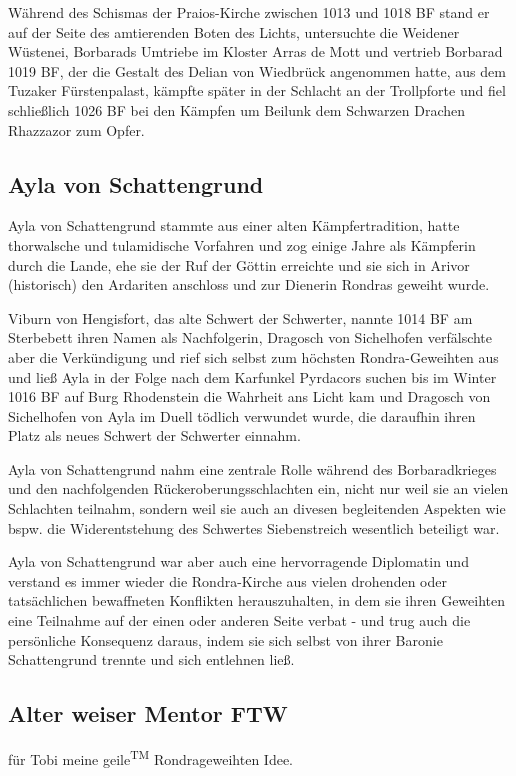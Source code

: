 Während des Schismas der Praios-Kirche zwischen 1013 und 1018 BF stand er auf der Seite des amtierenden Boten des Lichts, untersuchte die Weidener Wüstenei, Borbarads Umtriebe im Kloster Arras de Mott und vertrieb Borbarad 1019 BF, der die Gestalt des Delian von Wiedbrück angenommen hatte, aus dem Tuzaker Fürstenpalast, kämpfte später in der Schlacht an der Trollpforte und fiel schließlich 1026 BF bei den Kämpfen um Beilunk dem Schwarzen Drachen Rhazzazor zum Opfer. 

\subsection{Ayla von Schattengrund}
Ayla von Schattengrund stammte aus einer alten Kämpfertradition, hatte thorwalsche und tulamidische Vorfahren und zog einige Jahre als Kämpferin durch die Lande, ehe sie der Ruf der Göttin erreichte und sie sich in Arivor (historisch) den Ardariten anschloss und zur Dienerin Rondras geweiht wurde.

Viburn von Hengisfort, das alte Schwert der Schwerter, nannte 1014 BF am Sterbebett ihren Namen als Nachfolgerin, Dragosch von Sichelhofen verfälschte aber die Verkündigung und rief sich selbst zum höchsten Rondra-Geweihten aus und ließ Ayla in der Folge nach dem Karfunkel Pyrdacors suchen bis im Winter 1016 BF auf Burg Rhodenstein die Wahrheit ans Licht kam und Dragosch von Sichelhofen von Ayla im Duell tödlich verwundet wurde, die daraufhin ihren Platz als neues Schwert der Schwerter einnahm.

Ayla von Schattengrund nahm eine zentrale Rolle während des Borbaradkrieges und den nachfolgenden Rückeroberungsschlachten ein, nicht nur weil sie an vielen Schlachten teilnahm, sondern weil sie auch an divesen begleitenden Aspekten wie bspw. die Widerentstehung des Schwertes Siebenstreich wesentlich beteiligt war.

Ayla von Schattengrund war aber auch eine hervorragende Diplomatin und verstand es immer wieder die Rondra-Kirche aus vielen drohenden oder tatsächlichen bewaffneten Konflikten herauszuhalten, in dem sie ihren Geweihten eine Teilnahme auf der einen oder anderen Seite verbat - und trug auch die persönliche Konsequenz daraus, indem sie sich selbst von ihrer Baronie Schattengrund trennte und sich entlehnen ließ.

\subsection{Alter weiser Mentor FTW}
für Tobi meine geile\textsuperscript{TM} Rondrageweihten Idee.

